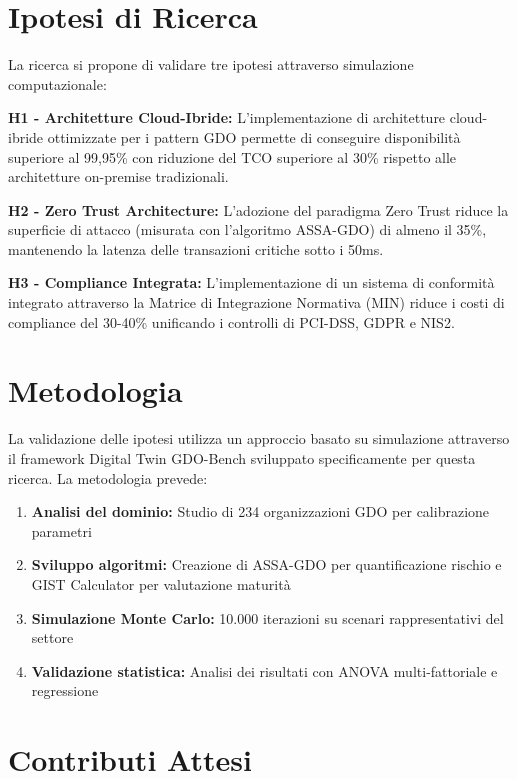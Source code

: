 \section{Ipotesi di Ricerca}
\label{sec:ipotesi}

La ricerca si propone di validare tre ipotesi attraverso simulazione computazionale:

\textbf{H1 - Architetture Cloud-Ibride:} L'implementazione di architetture cloud-ibride ottimizzate per i pattern GDO permette di conseguire disponibilità superiore al 99,95\% con riduzione del TCO superiore al 30\% rispetto alle architetture on-premise tradizionali.

\textbf{H2 - Zero Trust Architecture:} L'adozione del paradigma Zero Trust riduce la superficie di attacco (misurata con l'algoritmo ASSA-GDO) di almeno il 35\%, mantenendo la latenza delle transazioni critiche sotto i 50ms.

\textbf{H3 - Compliance Integrata:} L'implementazione di un sistema di conformità integrato attraverso la Matrice di Integrazione Normativa (MIN) riduce i costi di compliance del 30-40\% unificando i controlli di PCI-DSS, GDPR e NIS2.

\section{Metodologia}
\label{sec:metodologia}

La validazione delle ipotesi utilizza un approccio basato su simulazione attraverso il framework Digital Twin GDO-Bench sviluppato specificamente per questa ricerca. La metodologia prevede:

\begin{enumerate}
\item \textbf{Analisi del dominio:} Studio di 234 organizzazioni GDO per calibrazione parametri
\item \textbf{Sviluppo algoritmi:} Creazione di ASSA-GDO per quantificazione rischio e GIST Calculator per valutazione maturità
\item \textbf{Simulazione Monte Carlo:} 10.000 iterazioni su scenari rappresentativi del settore
\item \textbf{Validazione statistica:} Analisi dei risultati con ANOVA multi-fattoriale e regressione
\end{enumerate}

\section{Contributi Attesi}
\label{sec:contributi}

